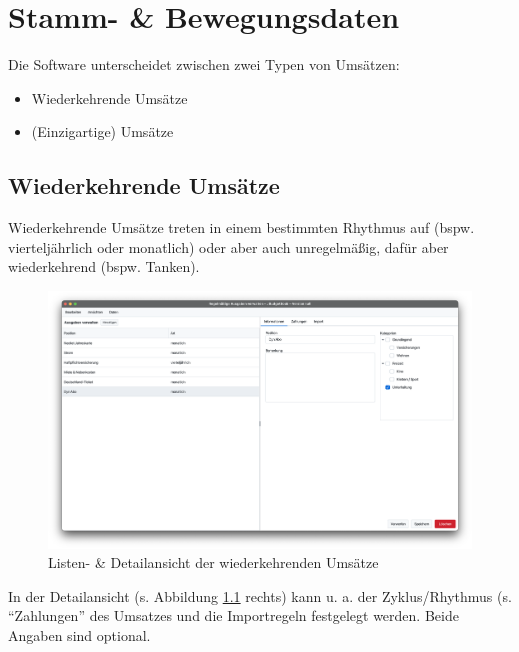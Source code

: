 \chapter{Stamm- \& Bewegungsdaten}

Die Software unterscheidet zwischen zwei Typen von Umsätzen:

\begin{itemize}[nosep]
	\item Wiederkehrende Umsätze
	\item (Einzigartige) Umsätze
\end{itemize}

\section{Wiederkehrende Umsätze} \label{sec:fixedExpenses}

Wiederkehrende Umsätze treten in einem bestimmten Rhythmus auf (bspw. vierteljährlich oder monatlich) oder aber auch unregelmäßig, dafür aber wiederkehrend (bspw. Tanken).

\begin{figure}[ht!]
	\centering
	\includegraphics[width=\textwidth]{img/Screenshot-FixedExpenses-MDV}
	\vspace{-2em}
	\caption{Listen- \& Detailansicht der wiederkehrenden Umsätze}
	\label{fig:mdvFixedExpenses}
\end{figure}

In der Detailansicht (s. Abbildung \ref{fig:mdvFixedExpenses} rechts) kann u. a. der Zyklus/Rhythmus (s. "`Zahlungen"' des Umsatzes und die Importregeln festgelegt werden. Beide Angaben sind optional.

